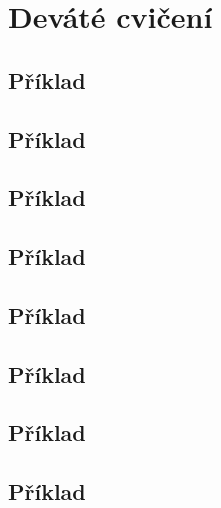 \section{Deváté cvičení}

\subsection{Příklad}

\subsection{Příklad}

\subsection{Příklad}

\subsection{Příklad}

\subsection{Příklad}

\subsection{Příklad}

\subsection{Příklad}

\subsection{Příklad}